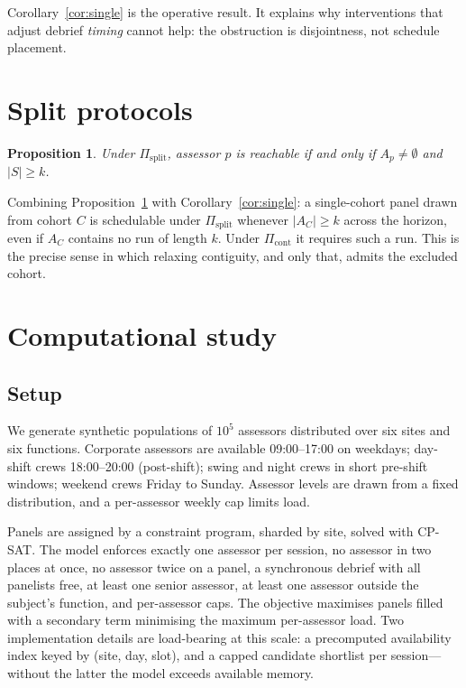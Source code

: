 \documentclass[11pt]{article}
\newtheorem{proposition}{Proposition}
\theoremstyle{definition}
\begin{document}
Corollary~\ref{cor:single} is the operative result. It explains why interventions that
adjust debrief \emph{timing} cannot help: the obstruction is disjointness, not schedule
placement.

\section{Split protocols}

\begin{proposition}
\label{prop:split}
Under $\Pi_{\mathrm{split}}$, assessor $p$ is reachable if and only if
$A_p \neq \emptyset$ and $|S| \ge k$.
\end{proposition}

Combining Proposition~\ref{prop:split} with Corollary~\ref{cor:single}: a single-cohort
panel drawn from cohort $C$ is schedulable under $\Pi_{\mathrm{split}}$ whenever
$|A_C| \ge k$ across the horizon, even if $A_C$ contains no run of length $k$. Under
$\Pi_{\mathrm{cont}}$ it requires such a run. This is the precise sense in which
relaxing contiguity, and only that, admits the excluded cohort.

\section{Computational study}
\label{sec:exp}

\subsection{Setup}

We generate synthetic populations of $10^5$ assessors distributed over six sites and six
functions. Corporate assessors are available 09:00--17:00 on weekdays; day-shift crews
18:00--20:00 (post-shift); swing and night crews in short pre-shift windows; weekend crews
Friday to Sunday. Assessor levels are drawn from a fixed distribution, and a per-assessor
weekly cap limits load.

Panels are assigned by a constraint program, sharded by site, solved with CP-SAT. The
model enforces exactly one assessor per session, no assessor in two places at once, no
assessor twice on a panel, a synchronous debrief with all panelists free, at least one
senior assessor, at least one assessor outside the subject's function, and per-assessor
caps. The objective maximises panels filled with a secondary term minimising the maximum
per-assessor load. Two implementation details are load-bearing at this scale: a
precomputed availability index keyed by (site, day, slot), and a capped candidate
shortlist per session---without the latter the model exceeds available memory.
\end{document}
